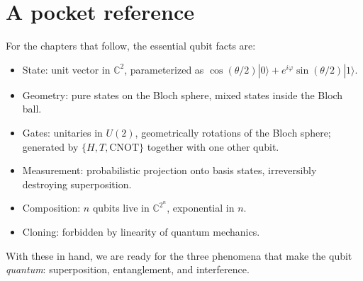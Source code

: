 \section{A pocket reference}

For the chapters that follow, the essential qubit facts are:

\begin{itemize}
  \item State: unit vector in $\mathbb{C}^2$, parameterized as $\cos(\theta/2)|0\rangle + e^{i\varphi}\sin(\theta/2)|1\rangle$.
  \item Geometry: pure states on the Bloch sphere, mixed states inside the Bloch ball.
  \item Gates: unitaries in $U(2)$, geometrically rotations of the Bloch sphere; generated by $\{H, T, \mathrm{CNOT}\}$ together with one other qubit.
  \item Measurement: probabilistic projection onto basis states, irreversibly destroying superposition.
  \item Composition: $n$ qubits live in $\mathbb{C}^{2^n}$, exponential in $n$.
  \item Cloning: forbidden by linearity of quantum mechanics.
\end{itemize}

With these in hand, we are ready for the three phenomena that make the qubit \emph{quantum}: superposition, entanglement, and interference.

\textsep
